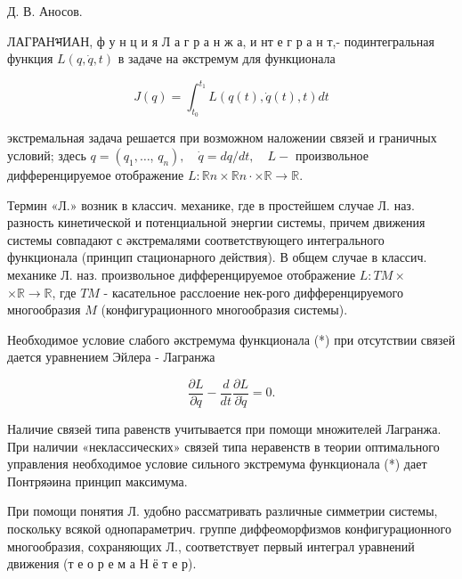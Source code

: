 \documentclass[10pt]{article}
\begin{document}
Д. В. Аносов.



ЛАГРАНभИАН, ф у н ц и я Л а г р а н ж а, и нт е г р а н т,- подинтегральная функция $L(q, \dot{q}, t)$ в задаче на әкстремум для функционала



\[

J(q)=\int_{t_{0}}^{t_{1}} L(q(t), \dot{q}(t), t) d t

\]



экстремальная задача решается при возможном наложении связей и граничных условий; здесь $q=\left(q_{1}, \ldots\right.$, $\left.q_{n}\right), \quad \dot{q}=d q / d t, \quad L-$ произвольное дифференцируемое отображение $L: \mathbb{R} n \times \mathbb{R} n \cdot \times \mathbb{R} \rightarrow \mathbb{R}$.



Термин «Л.» возник в классич. механике, где в простейшем случае Л. наз. разность кинетической и потенциальной энергии системы, причем движения системы совпадают с әкстремалями соответствующего интегрального функционала (принцип стационарного действия). В общем случае в классич. механике Л. наз. произвольное дифференцируемое отображение $L: T M \times$ $\times \mathbb{R} \rightarrow \mathbb{R}$, где $T M$ - касательное расслоение нек-рого дифференцируемого многообразия $M$ (конфигурационного многообразия системы).



Необходимое условие слабого әкстремума функционала (*) при отсутствии связей дается уравнением Эйлера - Лагранжа



\[

\frac{\partial L}{\partial q}-\frac{d}{d t} \frac{\partial L}{\partial \dot{q}}=0 .

\]



Наличие связей типа равенств учитывается при помощи множителей Лагранжа. При наличии «неклассических» связей типа неравенств в теории оптимального управления необходимое условие сильного экстремума функционала (*) дает Понтряәина принцип максимума.



При помощи понятия Л. удобно рассматривать различные симметрии системы, поскольку всякой однопараметрич. группе диффеоморфизмов конфигурационного многообразия, сохраняющих Л., соответствует первый интеграл уравнений движения (т е о р е м а Н ё т е р).
\end{document}
